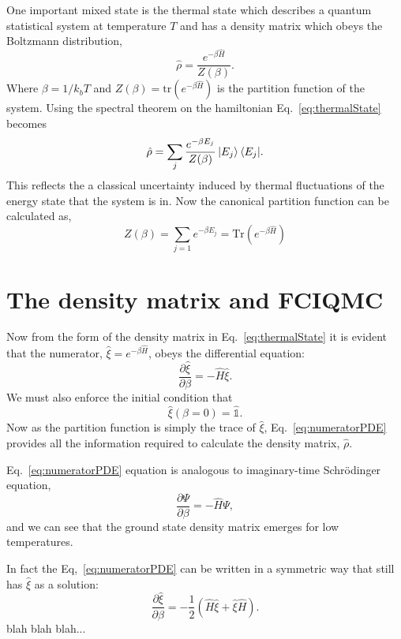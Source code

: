 \documentclass[12pt,a4paper]{article}
\begin{document}
One important mixed state is the thermal state which describes a quantum statistical system at temperature $T$ and has a density matrix which obeys the Boltzmann distribution,
\begin{equation}
\label{eq:thermalState}
\hat{\rho} = \frac{e^{-\beta\hat{H}}}{Z(\beta)}.
\end{equation}
Where $\beta=1/k_bT$ and $Z(\beta) = \mbox{tr}(e^{-\beta\hat{H}})$ is the partition function of the system. Using the spectral theorem on the hamiltonian Eq.~\ref{eq:thermalState} becomes
\begin{equation}
\hat{\rho} = \sum_j{\frac{e^{-\beta E_j}}{Z(\beta)}\ket{E_j}\bra{E_j}}. 
\end{equation}
This reflects the a classical uncertainty induced by thermal fluctuations of the energy state that the system is in. Now the canonical partition function can be calculated as,
\begin{equation}
\label{eq:PartitionFunction}
Z(\beta) = \sum_{j=1}e^{-\beta E_j} = \mbox{Tr}\left(e^{-\beta \hat{H}} \right)
\end{equation}
\section{The density matrix and FCIQMC}
Now from the form of the density matrix in Eq.~\ref{eq:thermalState} it is evident that the numerator, $\hat{\xi} = e^{-\beta\hat{H}}$, obeys the differential equation:
\begin{equation}
\label{eq:numeratorPDE}
\frac{\partial\hat{\xi}}{\partial\beta} = -\hat{H}\hat{\xi}.
\end{equation}
We must also enforce the initial condition that 
\begin{equation}
\hat{\xi}\left(\beta = 0\right) = \hat{\mathbb{1}}.
\end{equation}
Now as the partition function is simply the trace of $\hat{\xi}$, Eq.~\ref{eq:numeratorPDE} provides all the information required to calculate the density matrix, $\hat{\rho}$.

Eq.~\ref{eq:numeratorPDE} equation is analogous to imaginary-time Schr\"{o}dinger equation,
\begin{equation}
\label{eq:imaginaryTimeSchrodinger}
\frac{\partial\Psi}{\partial\beta} = -\hat{H}\Psi,
\end{equation}
and we can see that the ground state density matrix emerges for low temperatures.

In fact the Eq,~\ref{eq:numeratorPDE} can be written in a symmetric way that still has $\hat{\xi}$ as a solution:
\begin{equation}
\label{eq:numeratorPDE}
\frac{\partial\hat{\xi}}{\partial\beta} = -\frac{1}{2}\left(\hat{H}\hat{\xi}+\hat{\xi}\hat{H}\right).
\end{equation}
blah blah blah...
\end{document}
